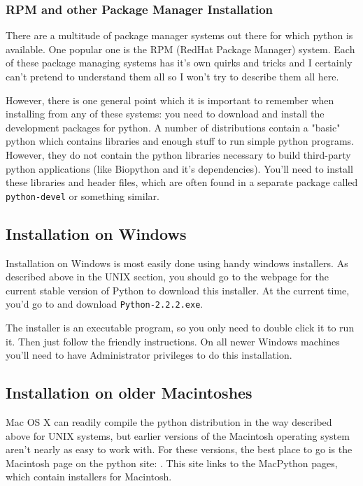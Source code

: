 \documentclass{article}
\begin{document}
\subsubsection{RPM and other Package Manager Installation}

There are a multitude of package manager systems out there for which
python is available. One popular one is the RPM (RedHat Package Manager)
system. Each of these package managing systems has it's own quirks and
tricks and I certainly can't pretend to understand them all so I won't
try to describe them all here.


However, there is one general point which it is important to remember
when installing from any of these systems: you need to download and
install the development packages for python. A number of distributions
contain a "basic" python which contains libraries and enough stuff to
run simple python programs. However, they do not contain the python
libraries necessary to build third-party python applications (like
Biopython and it's dependencies). You'll need to install these libraries
and header files, which are often found in a separate package called
\verb|python-devel| or something similar. 

\subsection{Installation on Windows} 

Installation on Windows is most easily done using handy windows
installers. As described above in the UNIX section, you should go to the
webpage for the current stable version of Python to download this
installer. At the current time, you'd go to
 and download
\verb|Python-2.2.2.exe|. 


The installer is an executable program, so you only need to double click
it to run it. Then just follow the friendly instructions. On all newer Windows
machines you'll need to have Administrator privileges to do this
installation.

\subsection{Installation on older Macintoshes}

Mac OS X can readily compile the python distribution in the way
described above for UNIX systems, but earlier versions of the Macintosh
operating system aren't nearly as easy to work with. For these versions,
the best place to go is the Macintosh page on the python site:
. This
site links to the MacPython pages, which contain installers for
Macintosh.
\end{document}
